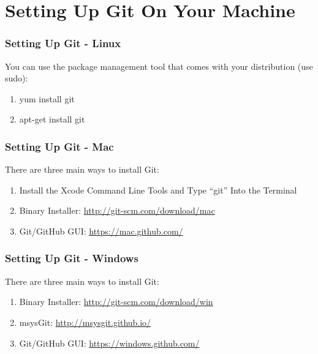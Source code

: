 
\section[Setting Up Git]{Setting Up Git On Your Machine}

\begin{frame}
\frametitle{\large{Setting Up Git - Linux}}
You can use the package management tool that comes with your distribution (use sudo):
\begin{enumerate}
\item yum install git
\item apt-get install git
\end{enumerate}
\end{frame}
\note{}

\begin{frame}
\frametitle{\large{Setting Up Git - Mac}}
There are three main ways to install Git:
\begin{enumerate}
\item Install the Xcode Command Line Tools and Type ``git'' Into the Terminal
\item Binary Installer: \href{http://git-scm.com/download/mac}{http://git-scm.com/download/mac}
\item Git/GitHub GUI: \href{https://mac.github.com/}{https://mac.github.com/}
\end{enumerate}
\end{frame}

\begin{frame}
\frametitle{\large{Setting Up Git - Windows}}
There are three main ways to install Git:
\begin{enumerate}
\item Binary Installer: \href{http://git-scm.com/download/win}{http://git-scm.com/download/win}
\item msysGit: \href{http://msysgit.github.io/}{http://msysgit.github.io/}
\item Git/GitHub GUI: \href{https://windows.github.com/}{https://windows.github.com/}
\end{enumerate}
\end{frame}

